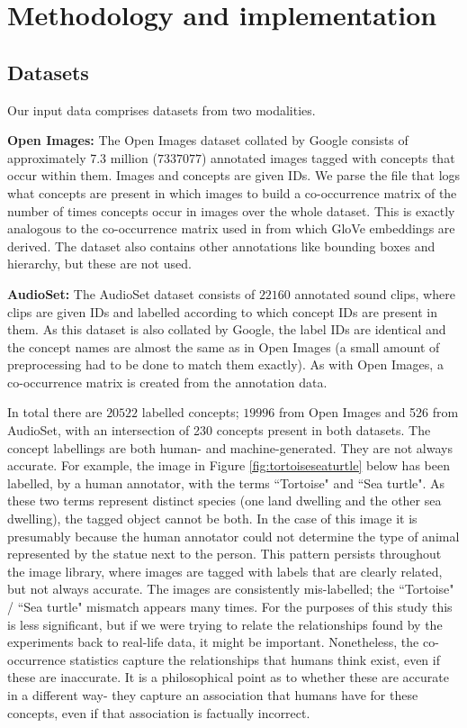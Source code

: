 
\chapter{Methodology and implementation}

\section{Datasets}

Our input data comprises datasets from two modalities. 

\textbf{Open Images:} The Open Images dataset \cite{openimages} collated by Google consists of approximately 7.3 million ($7337077$) annotated images tagged with concepts that occur within them. Images and concepts are given IDs. We parse the file that logs what concepts are present in which images to build a co-occurrence matrix of the number of times concepts occur in images over the whole dataset. This is exactly analogous to the co-occurrence matrix used in \cite{pennington2014glove} from which GloVe embeddings are derived. The dataset also contains other annotations like bounding boxes and hierarchy, but these are not used.

\textbf{AudioSet:} The AudioSet dataset \cite{audioset} consists of $22160$ annotated sound clips, where clips are given IDs and labelled according to which concept IDs are present in them. As this dataset is also collated by Google, the label IDs are identical and the concept names are almost the same as in Open Images (a small amount of preprocessing had to be done to match them exactly). As with Open Images, a co-occurrence matrix is created from the annotation data. 

In total there are $20522$ labelled concepts; $19996$ from Open Images and 526 from AudioSet, with an intersection of 230 concepts present in both datasets. 
The concept labellings are both human- and machine-generated. They are not always accurate. For example, the image in Figure \ref{fig:tortoiseseaturtle} below has been labelled, by a human annotator, with the terms ``Tortoise" and ``Sea turtle". As these two terms represent distinct species (one land dwelling and the other sea dwelling), the tagged object cannot be both. In the case of this image it is presumably because the human annotator could not determine the type of animal represented by the statue next to the person. This pattern persists throughout the image library, where images are tagged with labels that are clearly related, but not always accurate. The images are consistently mis-labelled; the ``Tortoise" / ``Sea turtle" mismatch appears many times. For the purposes of this study this is less significant, but if we were trying to relate the relationships found by the experiments back to real-life data, it might be important. Nonetheless, the co-occurrence statistics capture the relationships that humans think exist, even if these are inaccurate. It is a philosophical point as to whether these are accurate in a different way- they capture an association that humans have for these concepts, even if that association is factually incorrect. 

